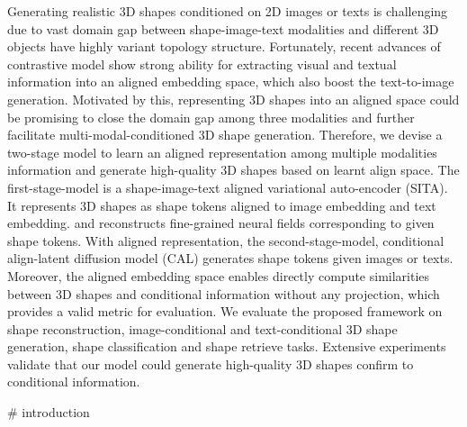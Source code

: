 Generating realistic 3D shapes conditioned on 2D images or texts is challenging due to vast domain gap between shape-image-text modalities and different 3D objects have highly variant topology structure.%
Fortunately, recent advances of contrastive model show strong ability for extracting visual and textual information into an aligned embedding space, which also boost the text-to-image generation.
Motivated by this, representing 3D shapes into an aligned space could be promising to close the domain gap among three modalities and further facilitate multi-modal-conditioned 3D shape generation.
Therefore, we devise a two-stage model to learn an aligned representation among multiple modalities information and generate high-quality 3D shapes based on learnt align space.
The first-stage-model is a shape-image-text aligned variational auto-encoder (SITA). It represents 3D shapes as shape tokens aligned to image embedding and text embedding. and reconstructs fine-grained neural fields corresponding to given shape tokens.
With aligned representation, the second-stage-model, conditional align-latent diffusion model (CAL) generates shape tokens given images or texts.
Moreover, the aligned embedding space enables directly compute similarities between 3D shapes and conditional information without any projection, which provides a valid metric for evaluation. 
We evaluate the proposed framework on shape reconstruction, image-conditional and text-conditional 3D shape generation, shape classification and shape retrieve tasks. Extensive experiments validate that our model could generate high-quality 3D shapes confirm to conditional information. 











# introduction 

